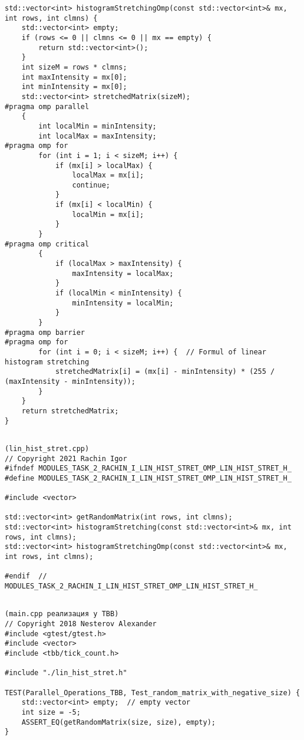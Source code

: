 \documentclass{report}
\begin{document}
\begin{thebibliography}{1}
\begin{lstlisting}
std::vector<int> histogramStretchingOmp(const std::vector<int>& mx, int rows, int clmns) {
    std::vector<int> empty;
    if (rows <= 0 || clmns <= 0 || mx == empty) {
        return std::vector<int>();
    }
    int sizeM = rows * clmns;
    int maxIntensity = mx[0];
    int minIntensity = mx[0];
    std::vector<int> stretchedMatrix(sizeM);
#pragma omp parallel
    {
        int localMin = minIntensity;
        int localMax = maxIntensity;
#pragma omp for
        for (int i = 1; i < sizeM; i++) {
            if (mx[i] > localMax) {
                localMax = mx[i];
                continue;
            }
            if (mx[i] < localMin) {
                localMin = mx[i];
            }
        }
#pragma omp critical
        {
            if (localMax > maxIntensity) {
                maxIntensity = localMax;
            }
            if (localMin < minIntensity) {
                minIntensity = localMin;
            }
        }
#pragma omp barrier
#pragma omp for
        for (int i = 0; i < sizeM; i++) {  // Formul of linear histogram stretching
            stretchedMatrix[i] = (mx[i] - minIntensity) * (255 / (maxIntensity - minIntensity));
        }
    }
    return stretchedMatrix;
}


\end{lstlisting}
\newpage
\begin{lstlisting}
(lin_hist_stret.cpp)
// Copyright 2021 Rachin Igor
#ifndef MODULES_TASK_2_RACHIN_I_LIN_HIST_STRET_OMP_LIN_HIST_STRET_H_
#define MODULES_TASK_2_RACHIN_I_LIN_HIST_STRET_OMP_LIN_HIST_STRET_H_

#include <vector>

std::vector<int> getRandomMatrix(int rows, int clmns);
std::vector<int> histogramStretching(const std::vector<int>& mx, int rows, int clmns);
std::vector<int> histogramStretchingOmp(const std::vector<int>& mx, int rows, int clmns);

#endif  // MODULES_TASK_2_RACHIN_I_LIN_HIST_STRET_OMP_LIN_HIST_STRET_H_


\end{lstlisting}
\newpage
\begin{lstlisting}
(main.cpp реализация у TBB)
// Copyright 2018 Nesterov Alexander
#include <gtest/gtest.h>
#include <vector>
#include <tbb/tick_count.h>

#include "./lin_hist_stret.h"

TEST(Parallel_Operations_TBB, Test_random_matrix_with_negative_size) {
    std::vector<int> empty;  // empty vector
    int size = -5;
    ASSERT_EQ(getRandomMatrix(size, size), empty);
}


\end{lstlisting}
\end{thebibliography}
\end{document}
